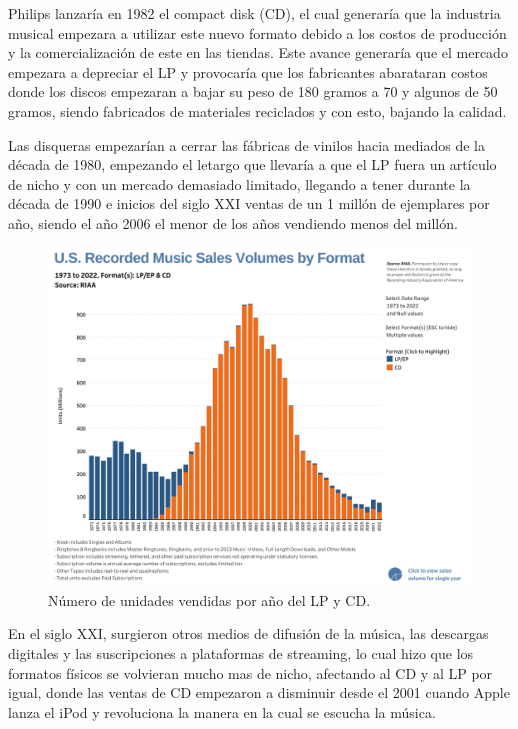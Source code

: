 \documentclass{article}
\begin{document}
Philips lanzaría en 1982 el compact disk (CD), el cual generaría que la industria musical empezara a utilizar este nuevo formato debido a los costos de producción y la comercialización de este en las tiendas. Este avance generaría que el mercado empezara a depreciar el LP y provocaría que los fabricantes abarataran costos donde los discos empezaran a bajar su peso de 180 gramos a 70 y algunos de 50 gramos, siendo fabricados de materiales reciclados y con esto, bajando la calidad.\cite{youtube}\\

\endgroup

Las disqueras empezarían a cerrar las fábricas de vinilos hacia mediados de la década de 1980, empezando el letargo que llevaría a que el LP fuera un artículo de nicho y con un mercado demasiado limitado, llegando a tener durante la década de 1990 e inicios del siglo XXI ventas de un 1 millón de ejemplares por año, siendo el año 2006 el menor de los años vendiendo menos del millón.\cite{wikirevival}\\

\begin{figure}[h]
    \centering
    \includegraphics[width=\textwidth]{images/sales.png}
    \vspace{-5pt}
    \caption{Número de unidades vendidas por año del LP y CD.\cite{riaa}}
\end{figure}

En el siglo XXI, surgieron otros medios de difusión de la música, las descargas digitales y las suscripciones a plataformas de streaming, lo cual hizo que los formatos físicos se volvieran mucho mas de nicho, afectando al CD y al LP por igual, donde las ventas de CD empezaron a disminuir desde el 2001 cuando Apple lanza el iPod y revoluciona la manera en la cual se escucha la música.
\end{document}
